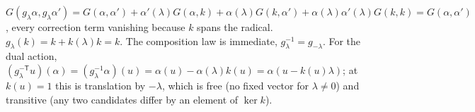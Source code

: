 $G(g_\lambda\alpha, g_\lambda\alpha') = G(\alpha, \alpha') + \alpha'(\lambda)G(\alpha, k) + \alpha(\lambda)G(k, \alpha') + \alpha(\lambda)\alpha'(\lambda)G(k,k) = G(\alpha, \alpha')$, every correction term vanishing because $k$ spans the radical. $g_\lambda(k) = k + k(\lambda)k = k$. The composition law is immediate, $g_\lambda^{-1} = g_{-\lambda}$. For the dual action, $(g_\lambda^{-\mathsf{T}}u)(\alpha) = (g_\lambda^{-1}\alpha)(u) = \alpha(u) - \alpha(\lambda)k(u) = \alpha(u - k(u)\lambda)$; at $k(u) = 1$ this is translation by $-\lambda$, which is free (no fixed vector for $\lambda \neq 0$) and transitive (any two candidates differ by an element of $\ker k$).
